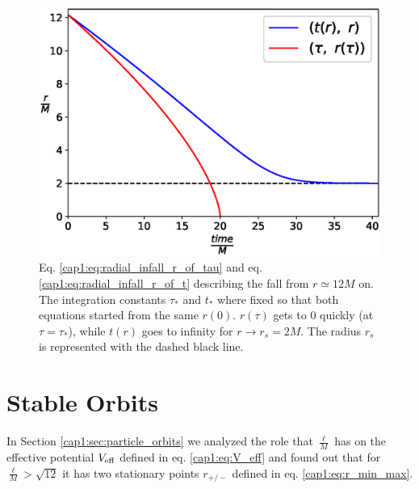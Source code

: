 \begin{figure}[h]
    \centering
    \includegraphics[width = 0.8 \textwidth]{Figures/radial_infall.eps}
    \caption{Eq. \ref{cap1:eq:radial_infall_r_of_tau} and eq.
    \ref{cap1:eq:radial_infall_r_of_t} describing the fall from
    $r \simeq 12M$ on.
    The integration constants $\tau_*$ and $t_*$ where fixed so that both
    equations started from the same $r(0)$.
    $r(\tau)$ gets to 0 quickly (at $\tau = \tau_*$), while $t(r)$ goes to
    infinity for $r \rightarrow r_s = 2M$. The \Sh radius $r_s$ is represented
    with the dashed black line.}
    \label{cap1:fig:radial_infall}

\end{figure}

\newpage


\section{Stable Orbits}
\label{cap1:sec:stable_orbits}

In Section \ref{cap1:sec:particle_orbits} we analyzed the role that
$\frac{\ell}{M}$ has on the effective potential $V_{\rm eff}$ defined in eq.
\ref{cap1:eq:V_eff} and found out that for $\frac{\ell}{M} > \sqrt{12}$ it has
two stationary points $r_{+ / -}$ defined in eq. \ref{cap1:eq:r_min_max}.

